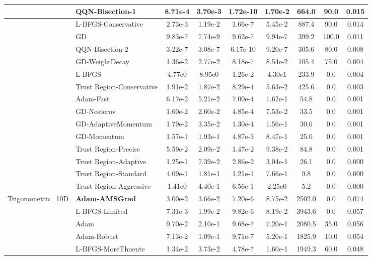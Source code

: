 \documentclass{article}
\begin{document}
\begin{longtable}{|l|l|c|c|c|c|c|c|c|}
\hline
 & QQN-Bisection-1 & 8.71e-4 & 3.70e-3 & 1.72e-10 & 1.70e-2 & 664.0 & 90.0 & 0.015 \\
\hline
 & L-BFGS-Conservative & 2.73e-3 & 1.19e-2 & 1.66e-7 & 5.45e-2 & 887.4 & 90.0 & 0.014 \\
\hline
 & GD & 9.83e-7 & 7.74e-9 & 9.62e-7 & 9.94e-7 & 399.2 & 100.0 & 0.011 \\
\hline
 & QQN-Bisection-2 & 3.22e-7 & 3.08e-7 & 6.17e-10 & 9.20e-7 & 305.6 & 80.0 & 0.008 \\
\hline
 & GD-WeightDecay & 1.36e-2 & 2.77e-2 & 8.18e-7 & 8.54e-2 & 105.4 & 75.0 & 0.004 \\
\hline
 & L-BFGS & 4.77e0 & 8.95e0 & 1.26e-2 & 4.30e1 & 233.9 & 0.0 & 0.004 \\
\hline
 & Trust Region-Conservative & 1.91e-2 & 1.87e-2 & 8.29e-4 & 5.63e-2 & 425.6 & 0.0 & 0.003 \\
\hline
 & Adam-Fast & 6.17e-2 & 5.21e-2 & 7.00e-4 & 1.62e-1 & 54.8 & 0.0 & 0.001 \\
\hline
 & GD-Nesterov & 1.60e-2 & 2.60e-2 & 4.85e-4 & 7.53e-2 & 33.5 & 0.0 & 0.001 \\
\hline
 & GD-AdaptiveMomentum & 1.79e-2 & 3.35e-2 & 1.30e-4 & 1.56e-1 & 30.6 & 0.0 & 0.001 \\
\hline
 & GD-Momentum & 1.57e-1 & 1.93e-1 & 4.87e-3 & 8.47e-1 & 25.0 & 0.0 & 0.001 \\
\hline
 & Trust Region-Precise & 5.59e-2 & 2.09e-2 & 1.47e-2 & 9.38e-2 & 84.8 & 0.0 & 0.001 \\
\hline
 & Trust Region-Adaptive & 1.25e-1 & 7.39e-2 & 2.86e-2 & 3.04e-1 & 26.1 & 0.0 & 0.000 \\
\hline
 & Trust Region-Standard & 4.09e-1 & 1.81e-1 & 1.21e-1 & 7.66e-1 & 9.8 & 0.0 & 0.000 \\
\hline
 & Trust Region-Aggressive & 1.41e0 & 4.40e-1 & 6.56e-1 & 2.25e0 & 5.2 & 0.0 & 0.000 \\
Trigonometric\_10D & \textbf{Adam-AMSGrad} & 3.00e-2 & 3.66e-2 & 7.20e-6 & 8.75e-2 & 2502.0 & 0.0 & 0.074 \\
\hline
 & L-BFGS-Limited & 7.31e-3 & 1.99e-2 & 9.82e-6 & 8.19e-2 & 3943.6 & 0.0 & 0.057 \\
\hline
 & Adam & 9.70e-2 & 2.10e-1 & 9.68e-7 & 7.20e-1 & 2080.5 & 35.0 & 0.056 \\
\hline
 & Adam-Robust & 7.13e-2 & 1.09e-1 & 9.71e-7 & 5.20e-1 & 1825.9 & 10.0 & 0.054 \\
\hline
 & L-BFGS-MoreThuente & 1.34e-2 & 3.73e-2 & 4.78e-7 & 1.60e-1 & 1949.3 & 60.0 & 0.048 \\

\end{longtable}
\end{document}
